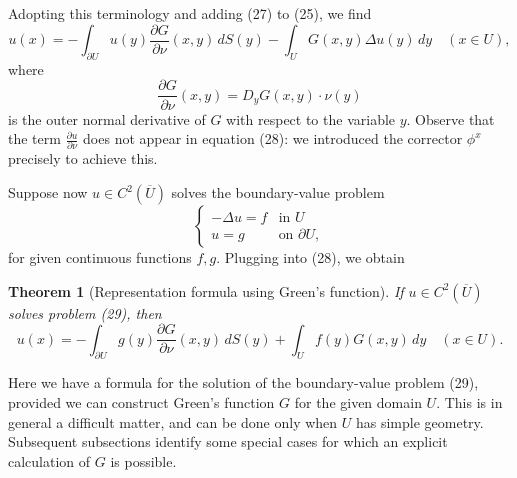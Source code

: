\documentclass[a4paper,12pt]{report}
\newtheorem{theorem}{Theorem}[section]
\begin{document}
\noindent
Adopting this terminology and adding (27) to (25), we find
\[
u(x) = - \int_{\partial U} u(y) \frac{\partial G}{\partial \nu} (x, y) \, dS(y) - \int_U G(x, y) \Delta u(y) \, dy \quad (x \in U), \tag{28}
\]
where
\[
\frac{\partial G}{\partial \nu} (x, y) = D_y G(x, y) \cdot \nu(y)
\]
is the outer normal derivative of \( G \) with respect to the variable \( y \). Observe that the term \( \frac{\partial u}{\partial \nu} \) does not appear in equation (28): we introduced the corrector \( \phi^x \) precisely to achieve this.

\noindent
Suppose now \( u \in C^2(\overline{U}) \) solves the boundary-value problem
\[
\begin{cases}
-\Delta u = f & \text{in } U \\
u = g & \text{on } \partial U,
\end{cases}
\]
for given continuous functions \( f, g \). Plugging into (28), we obtain

\begin{theorem}[Representation formula using Green’s function]
If \( u \in C^2(\overline{U}) \) solves problem (29), then
\[
u(x) = - \int_{\partial U} g(y) \frac{\partial G}{\partial \nu} (x, y) \, dS(y) + \int_U f(y) G(x, y) \, dy \quad (x \in U). \tag{30}
\]
\end{theorem}
Here we have a formula for the solution of the boundary-value problem (29), provided we can construct Green’s function \( G \) for the given domain \( U \). This is in general a difficult matter, and can be done only when \( U \) has simple geometry. Subsequent subsections identify some special cases for which an explicit calculation of \( G \) is possible.
\end{document}
